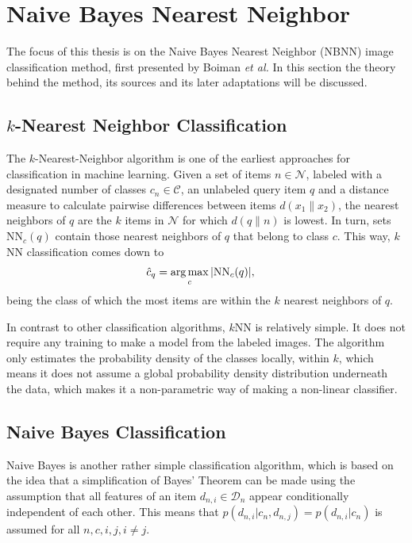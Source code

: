 \section{Naive Bayes Nearest Neighbor} %
\label{cha:naive_bayes_nearest_neighbor}

The focus of this thesis is on the Naive Bayes Nearest Neighbor (NBNN) image classification method, first presented by Boiman \emph{et al.} \cite{boiman2008defense} In this section the theory behind the method, its sources and its later adaptations will be discussed.

\subsection{$k$-Nearest Neighbor Classification} %
\label{sub:_k_nearest_neighbor}

The $k$-Nearest-Neighbor algorithm is one of the earliest approaches for classification in machine learning. Given a set of items $n \in \mathcal{N}$, labeled with a designated number of classes $c_n \in \mathcal{C}$, an unlabeled query item $q$ and a distance measure to calculate pairwise differences between items $d(x_1\|x_2)$, the nearest neighbors of $q$ are the $k$ items in $\mathcal{N}$ for which $d(q\|n)$ is lowest. In turn, sets $\text{NN}_c(q)$ contain those nearest neighbors of $q$ that belong to class $c$. This way, $k$NN classification comes down to
\begin{align}
    \hat c_q &= \operatorname*{arg\,max}_c |\text{NN}_c(q)|,
\end{align}
being the class of which the most items are within the $k$ nearest neighbors of $q$.

In contrast to other classification algorithms, $k$NN is relatively simple. It does not require any training to make a model from the labeled images. The algorithm only estimates the probability density of the classes locally, within $k$, which means it does not assume a global probability density distribution underneath the data, which makes it a non-parametric way of making a non-linear classifier.

\subsection{Naive Bayes Classification} %
\label{sub:NB}

Naive Bayes is another rather simple classification algorithm, which is based on the idea that a simplification of Bayes' Theorem can be made using the assumption that all features of an item $d_{n,i} \in \mathcal{D}_n$ appear conditionally independent of each other. This means that $p(d_{n,i} | c_n, d_{n,j}) = p(d_{n,i}|c_n)$ is assumed for all $n,c,i,j, i\neq j$. 

